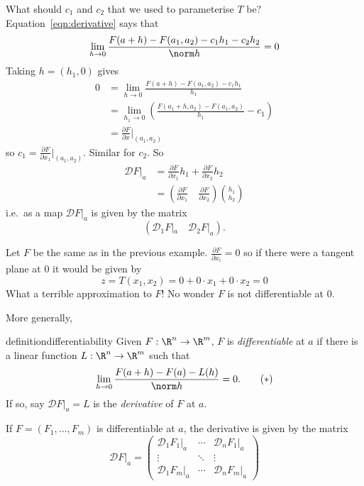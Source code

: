 \documentclass[a4paper]{article}
\newcommand*{\D}{\mathcal{D}}
\theoremstyle{definition}
\begin{document}
What should \(c_1\) and \(c_2\) that we used to parameterise \(T\) be? Equation~\eqref{eqn:derivative} says that
\[
  \lim_{h \to 0} \frac{F(a + h) - F(a_1, a_2) - c_1h_1 - c_2h_2}{\norm h} = 0
\]
Taking \(h = (h_1, 0)\) gives
\begin{align*}
  0 &= \lim_{h \to 0} \frac{F(a + h) - F(a_1, a_2) - c_1h_1}{h_1} \\
    &= \lim_{h_1 \to 0} \left( \frac{F(a_1 + h, a_2) - F(a_1, a_2)}{h_1} - c_1 \right) \\
    &= \frac{\partial F}{\partial x} \Big|_{(a_1, a_2)}
\end{align*}
so \(c_1 = \frac{\partial F}{\partial x_1}|_{(a_1, a_2)}\). Similar for \(c_2\). So
\begin{align*}
    \D F|_a &= \frac{\partial F}{\partial x_1} h_1 + \frac{\partial F}{\partial x_2} h_2 \\
            &= \left( \frac{\partial F}{\partial x_1} \quad \frac{\partial F}{\partial x_2} \right) \binom{h_1}{h_2}
\end{align*}
i.e.\ as a map \(\D F|_a\) is given by the matrix
\[
  (\D_1 F|_a \quad \D_2 F|_a ).
\]

\begin{eg}
  Let \(F\) be the same as in the previous example. \(\frac{\partial F}{\partial x_i} = 0\) so if there were a tangent plane at 0 it would be given by
  \[
    z = T(x_1, x_2) = 0 + 0 \cdot x_1 + 0 \cdot x_2 = 0
  \]
  What a terrible approximation to \(F\)! No wonder \(F\) is not differentiable at \(0\).
\end{eg}

More generally,

\begin{restatable}[Differentiability]{definition}{differentiability}
  Given \(F: \R^n \to \R^m\), \(F\) is \emph{differentiable} at \(a\) if there is a linear function \(L: \R^n \to \R^m\) such that
  \begin{equation*}
    \label{eqn:derivative2}
    \lim_{h \to 0} \frac{F(a + h) - F(a) - L(h)}{\norm h} = 0.
    \tag{\(\ast\)}
  \end{equation*}
  If so, say \(\D F|_a = L\) is the \emph{derivative} of \(F\) at \(a\).
\end{restatable}

If \(F = (F_1, \dots, F_m)\) is differentiable at \(a\), the derivative is given by the matrix
\[
  \D F|_a =
  \begin{pmatrix}
    \D_1F_1|_a & \cdots & \D_nF_1|_a \\
    \vdots & \ddots & \vdots \\
    \D_1F_m|_a & \cdots & \D_nF_m|_a
  \end{pmatrix}
\]
  
\end{document}
